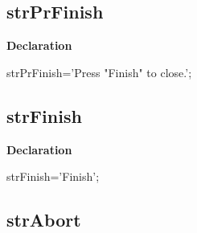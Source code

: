 \documentclass{report}
\newif\ifpdf
\begin{document}
\subsection*{strPrFinish}
\fi
\label{trstrings-strPrFinish}
\begin{list}{}{
\setlength{\itemindent}{0cm}
\setlength{\listparindent}{0cm}
\setlength{\leftmargin}{\evensidemargin}
\addtolength{\leftmargin}{\tmplength}
\settowidth{\labelsep}{X}
\addtolength{\leftmargin}{\labelsep}
\setlength{\labelwidth}{\tmplength}
}
\item[\textbf{Declaration}\hfill]
\ifpdf
\begin{flushleft}
\fi
\begin{ttfamily}
strPrFinish='Press "Finish" to close.';\end{ttfamily}

\ifpdf
\end{flushleft}
\fi

\end{list}
\ifpdf
\subsection*{\large{\textbf{strFinish}}\normalsize\hspace{1ex}\hrulefill}
\else
\subsection*{strFinish}
\fi
\label{trstrings-strFinish}
\begin{list}{}{
\setlength{\itemindent}{0cm}
\setlength{\listparindent}{0cm}
\setlength{\leftmargin}{\evensidemargin}
\addtolength{\leftmargin}{\tmplength}
\settowidth{\labelsep}{X}
\addtolength{\leftmargin}{\labelsep}
\setlength{\labelwidth}{\tmplength}
}
\item[\textbf{Declaration}\hfill]
\ifpdf
\begin{flushleft}
\fi
\begin{ttfamily}
strFinish='Finish';\end{ttfamily}

\ifpdf
\end{flushleft}
\fi

\end{list}
\ifpdf
\subsection*{\large{\textbf{strAbort}}\normalsize\hspace{1ex}\hrulefill}
\else
\end{document}
